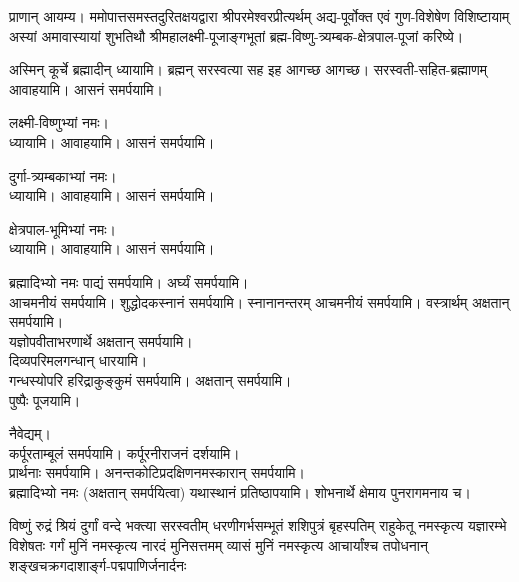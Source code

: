 
प्राणान् आयम्य। ममोपात्तसमस्तदुरितक्षयद्वारा श्रीपरमेश्वरप्रीत्यर्थम् अद्य-पूर्वोक्त एवं गुण-विशेषेण विशिष्टायाम् अस्यां
अमावास्यायां शुभतिथौ श्रीमहालक्ष्मी-पूजाङ्गभूतां ब्रह्म-विष्णु-त्र्यम्बक-क्षेत्रपाल-पूजां करिष्ये।

अस्मिन् कूर्चे ब्रह्मादीन् ध्यायामि। ब्रह्मन् सरस्वत्या सह इह आगच्छ आगच्छ। सरस्वती-सहित-ब्रह्माणम् आवाहयामि। आसनं समर्पयामि।

लक्ष्मी-विष्णुभ्यां नमः।\\
ध्यायामि। आवाहयामि। आसनं समर्पयामि।

दुर्गा-त्र्यम्बकाभ्यां नमः।\\
ध्यायामि। आवाहयामि। आसनं समर्पयामि।

क्षेत्रपाल-भूमिभ्यां नमः।\\
ध्यायामि। आवाहयामि। आसनं समर्पयामि।

ब्रह्मादिभ्यो नमः पाद्यं समर्पयामि। अर्घ्यं समर्पयामि।\\

आचमनीयं समर्पयामि। शुद्धोदकस्नानं समर्पयामि। स्नानानन्तरम् आचमनीयं समर्पयामि।
वस्त्रार्थम् अक्षतान् समर्पयामि।\\
यज्ञोपवीताभरणार्थे अक्षतान् समर्पयामि।\\
दिव्यपरिमलगन्धान् धारयामि।\\
गन्धस्योपरि हरिद्राकुङ्कुमं समर्पयामि। अक्षतान् समर्पयामि। \\
पुष्पैः पूजयामि।

नैवेद्यम्। \\
कर्पूरताम्बूलं समर्पयामि। कर्पूरनीराजनं दर्शयामि।\\
प्रार्थनाः समर्पयामि।
अनन्तकोटिप्रदक्षिणनमस्कारान् समर्पयामि।\\

ब्रह्मादिभ्यो नमः (अक्षतान् समर्पयित्वा) यथास्थानं प्रतिष्ठापयामि। शोभनार्थे क्षेमाय पुनरागमनाय च।


{विष्णुं रुद्रं श्रियं दुर्गां वन्दे भक्त्या सरस्वतीम्}
{धरणीगर्भसम्भूतं शशिपुत्रं बृहस्पतिम्}
{राहुकेतू नमस्कृत्य यज्ञारम्भे विशेषतः}
{गर्गं मुनिं नमस्कृत्य नारदं मुनिसत्तमम्}
{व्यासं मुनिं नमस्कृत्य आचार्यांश्च तपोधनान्}
{शङ्खचक्रगदाशार्ङ्ग-पद्मपाणिर्जनार्दनः}
